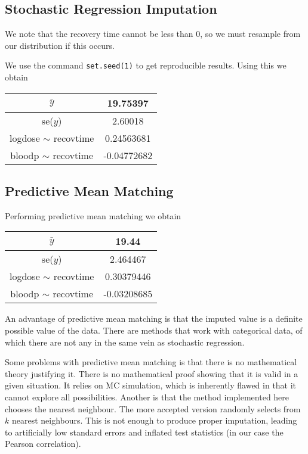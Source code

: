 \documentclass[11pt]{article}
\begin{document}
\subsection*{Stochastic Regression Imputation}

We note that the recovery time cannot be less than 0, so we must resample from our distribution if this occurs.

We use the command \texttt{set.seed(1)} to get reproducible results. Using this we obtain

\begin{table}[H]
	\centering
	\begin{tabular}{|c|c|}
		\hline 
		$\bar{y}$ & 19.75397\\ 
		\hline 
		se($y$) & 2.60018\\ 
		\hline 
		logdose $\sim$ recovtime & 0.24563681\\ 
		\hline 
		bloodp $\sim$ recovtime & -0.04772682\\ 
		\hline 
	\end{tabular} 
\end{table}

\pagebreak

\subsection*{Predictive Mean Matching}

Performing predictive mean matching we obtain 

\begin{table}[H]
	\centering
	\begin{tabular}{|c|c|}
		\hline 
		$\bar{y}$ & 19.44\\ 
		\hline 
		se($y$) & 2.464467\\ 
		\hline 
		logdose $\sim$ recovtime & 0.30379446\\ 
		\hline 
		bloodp $\sim$ recovtime & -0.03208685\\ 
		\hline 
	\end{tabular} 
\end{table}

An advantage of predictive mean matching is that the imputed value is a definite possible value of the data. There are methods that work with categorical data, of which there are not any in the same vein as stochastic regression. 

Some problems with predictive mean matching is that there is no mathematical theory justifying it. There is no mathematical proof showing that it is valid in a given situation. It relies on MC simulation, which is inherently flawed in that it cannot explore all possibilities. Another is that the method implemented here chooses the nearest neighbour. The more accepted version randomly selects from $k$ nearest neighbours. This is not enough to produce proper imputation, leading to artificially low standard errors and inflated test statistics (in our case the Pearson correlation). 
\end{document}
